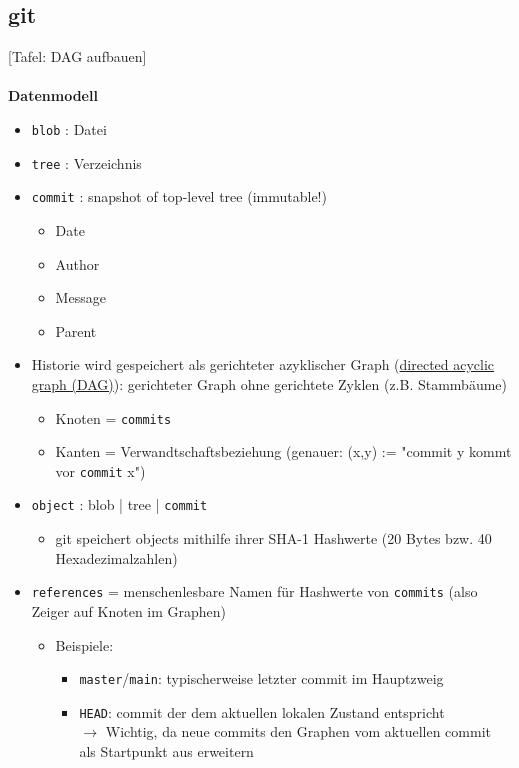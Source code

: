 \subsection{git}
[Tafel: DAG aufbauen]\\~\\
\textbf{Datenmodell}\\
\begin{itemize}
	\item \texttt{blob} : Datei
	\item \texttt{tree} : Verzeichnis
	\item \texttt{commit} : snapshot of top-level tree (immutable!)
	\begin{itemize}
		\item Date
		\item Author
		\item Message
		\item Parent
	\end{itemize}
	\item Historie wird gespeichert als gerichteter azyklischer Graph (\href{https://en.wikipedia.org/wiki/Directed_acyclic_graph}{directed acyclic graph (DAG)}): gerichteter Graph ohne gerichtete Zyklen (z.B. Stammbäume)
	\begin{itemize}
		\item Knoten = \texttt{commits}
		\item Kanten = Verwandtschaftsbeziehung (genauer: (x,y) := "commit y kommt vor \texttt{commit} x")
	\end{itemize}
	\item \texttt{object} : blob | tree | \texttt{commit}
	\begin{itemize}
		\item git speichert objects mithilfe ihrer SHA-1 Hashwerte (20 Bytes bzw. 40 Hexadezimalzahlen)
	\end{itemize}
	\item \texttt{references} = menschenlesbare Namen für Hashwerte von \texttt{commits} (also Zeiger auf Knoten im Graphen)
	\begin{itemize}
		\item Beispiele:
			\begin{itemize}
			\item  \texttt{master}/\texttt{main}: typischerweise letzter commit im Hauptzweig
			\item \texttt{HEAD}: commit der dem aktuellen lokalen Zustand entspricht\\
			$\rightarrow$ Wichtig, da neue commits den Graphen vom aktuellen commit als Startpunkt aus erweitern\\

\end{itemize}
\end{itemize}
\end{itemize}
